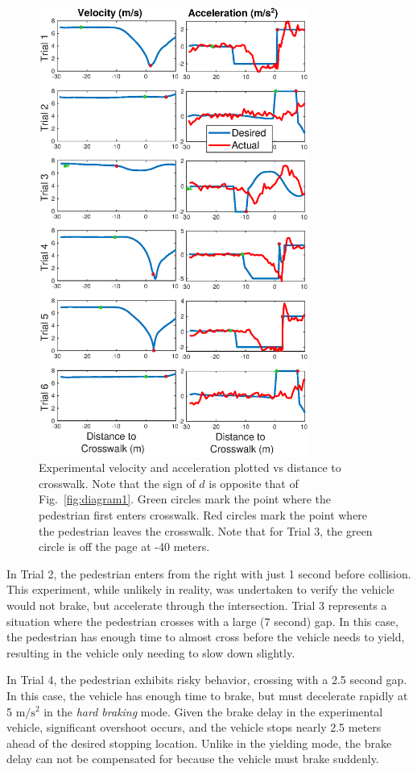 \documentclass[letterpaper, 10 pt, conference]{ieeeconf}  %
\begin{document}
\begin{figure}[h]
\centering
\includegraphics[width=3.5in]{figures/expPlot.eps}
\caption{Experimental velocity and acceleration plotted vs distance to crosswalk. Note that the sign of $d$ is opposite that of Fig.~\ref{fig:diagram1}. Green circles mark the point where the pedestrian first enters crosswalk. Red circles mark the point where the pedestrian leaves the crosswalk. Note that for Trial 3, the green circle is off the page at -40 meters.}
\label{fig:expPlot}
\end{figure}

In Trial 2, the pedestrian enters from the right with just 1 second before collision. This experiment, while unlikely in reality, was undertaken to verify the vehicle would not brake, but accelerate through the intersection. Trial 3 represents a situation where the pedestrian crosses with a large (7 second) gap. In this case, the pedestrian has enough time to almost cross before the vehicle needs to yield, resulting in the vehicle only needing to slow down slightly. 

In Trial 4, the pedestrian exhibits risky behavior, crossing with a 2.5 second gap. In this case, the vehicle has enough time to brake, but must decelerate rapidly at 5 $\mathrm{m/s^2}$ in the \textit{hard braking} mode. Given the brake delay in the experimental vehicle, significant overshoot occurs, and the vehicle stops nearly 2.5 meters ahead of the desired stopping location. Unlike in the yielding mode, the brake delay can not be compensated for because the vehicle must brake suddenly. 
\end{document}
